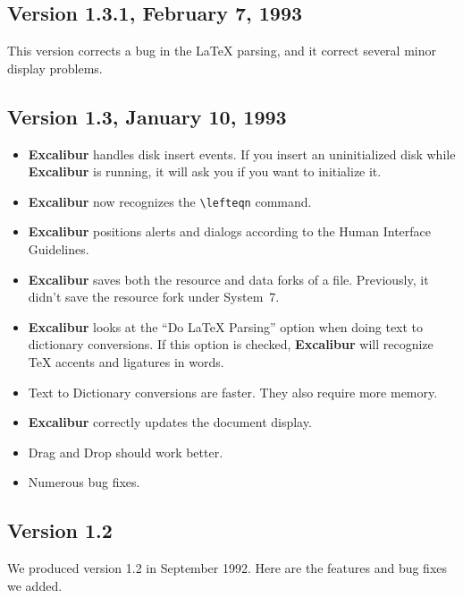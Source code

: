 ﻿\documentclass[11pt,titlepage]{article}
\newcommand{\ex}{\textbf{Excalibur}}
\begin{document}
\subsection{Version 1.3.1, February 7, 1993}

This version corrects a bug in the \LaTeX{} parsing, and it correct
several minor display problems.

\subsection{Version 1.3, January 10, 1993}

\begin{itemize}
\item \ex{} handles disk insert events. If you insert an uninitialized
  disk while \ex{} is running, it will ask you if you want to
  initialize it.

\item \ex{} now recognizes the \verb+\lefteqn+ command.

\item \ex{} positions alerts and dialogs according to the Human
  Interface Guidelines.

\item \ex{} saves both the resource and data forks of a file.
  Previously, it didn't save the resource fork under System~7.

\item \ex{} looks at the ``Do LaTeX Parsing'' option when doing text
  to dictionary conversions. If this option is checked, \ex{} will
  recognize \TeX{} accents and ligatures in words.

\item Text to Dictionary conversions are faster. They also require
  more memory.

\item \ex{} correctly updates the document display.

\item Drag and Drop should work better.

\item Numerous bug fixes.
\end{itemize}

\subsection{Version 1.2}

We produced version 1.2 in September 1992.  Here are the features and
bug fixes we added.
\end{document}
